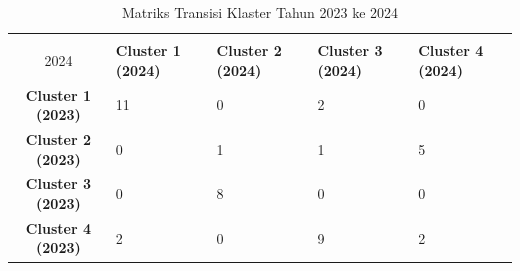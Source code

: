 \begin{table}[H]
\centering
\caption{Matriks Transisi Klaster Tahun 2023 ke 2024} \label{tab:transisi_2023_2024}
\begin{tabular}{|c|p{2cm}|p{2cm}|p{2cm}|p{2cm}|}
\hline
\textbf{Tahun 2023 \\ 2024} & \textbf{Cluster 1 (2024)} & \textbf{Cluster 2 (2024)} & \textbf{Cluster 3 (2024)} & \textbf{Cluster 4 (2024)} \\ \hline
\textbf{Cluster 1 (2023)} & 11 & 0 & 2 & 0 \\ \hline
\textbf{Cluster 2 (2023)} & 0 & 1 & 1 & 5 \\ \hline
\textbf{Cluster 3 (2023)} & 0 & 8 & 0 & 0 \\ \hline
\textbf{Cluster 4 (2023)} & 2 & 0 & 9 & 2 \\ \hline
\end{tabular}
\end{table}